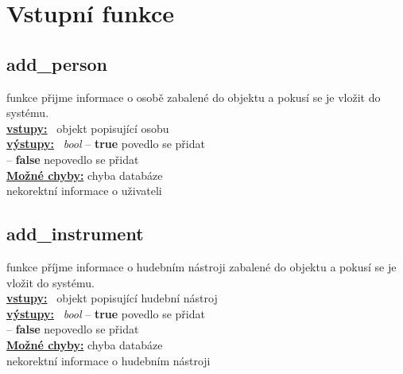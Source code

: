 \documentclass[a4paper, 11pt, twocolumn]{article}
\begin{document}

\section{Vstupní funkce}\label{vstupnuxed-funkce}

\subsection{add\_person}\label{addux5fperson}
\vspace*{-0.3cm}
funkce přijme informace o osobě zabalené do objektu a pokusí se je vložit do systému. \\
\noindent \underline{\textbf{vstupy:}} \, objekt popisující osobu  \\
\noindent \underline{\textbf{výstupy:}} \, \textit{bool} -- \textbf{true} povedlo se přidat \\
\hspace*{2.35cm} -- \textbf{false} nepovedlo se přidat  \\
\underline{\textbf{Možné chyby:}} chyba databáze \\
\hspace*{1.4cm} nekorektní informace o uživateli

\subsection{add\_instrument}\label{addux5finstrument}
\vspace*{-0.3cm}
funkce příjme informace o hudebním nástroji zabalené do objektu a pokusí se je vložit do systému. \\
\noindent \underline{\textbf{vstupy:}} \, objekt popisující hudební nástroj  \\
\noindent \underline{\textbf{výstupy:}} \, \textit{bool} -- \textbf{true} povedlo se přidat \\
\hspace*{2.35cm} -- \textbf{false} nepovedlo se přidat  \\
\underline{\textbf{Možné chyby:}} chyba databáze \\
\hspace*{1.4cm} nekorektní informace o hudebním nástroji
\end{document}
